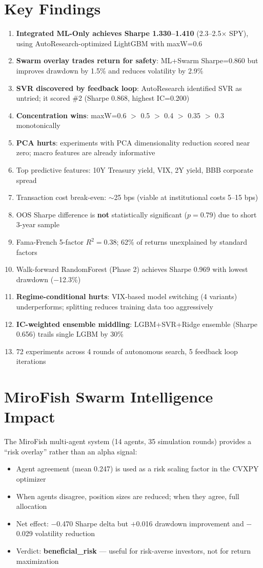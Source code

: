 \documentclass[12pt]{article}
\begin{document}
\section{Key Findings}
\begin{enumerate}
\item \textbf{Integrated ML-Only achieves Sharpe 1.330--1.410} (2.3--2.5$\times$ SPY), using AutoResearch-optimized LightGBM with maxW=0.6
\item \textbf{Swarm overlay trades return for safety}: ML+Swarm Sharpe=0.860 but improves drawdown by 1.5\% and reduces volatility by 2.9\%
\item \textbf{SVR discovered by feedback loop}: AutoResearch identified SVR as untried; it scored \#2 (Sharpe 0.868, highest IC=0.200)
\item \textbf{Concentration wins}: maxW=0.6 $>$ 0.5 $>$ 0.4 $>$ 0.35 $>$ 0.3 monotonically
\item \textbf{PCA hurts}: experiments with PCA dimensionality reduction scored near zero; macro features are already informative
\item Top predictive features: 10Y Treasury yield, VIX, 2Y yield, BBB corporate spread
\item Transaction cost break-even: $\sim$25 bps (viable at institutional costs 5--15 bps)
\item OOS Sharpe difference is \textbf{not} statistically significant ($p = 0.79$) due to short 3-year sample
\item Fama-French 5-factor $R^2 = 0.38$; 62\% of returns unexplained by standard factors
\item Walk-forward RandomForest (Phase 2) achieves Sharpe 0.969 with lowest drawdown ($-$12.3\%)
\item \textbf{Regime-conditional hurts}: VIX-based model switching (4 variants) underperforms; splitting reduces training data too aggressively
\item \textbf{IC-weighted ensemble middling}: LGBM+SVR+Ridge ensemble (Sharpe 0.656) trails single LGBM by 30\%
\item 72 experiments across 4 rounds of autonomous search, 5 feedback loop iterations
\end{enumerate}

\section{MiroFish Swarm Intelligence Impact}
The MiroFish multi-agent system (14 agents, 35 simulation rounds) provides a ``risk overlay'' rather than an alpha signal:
\begin{itemize}
\item Agent agreement (mean 0.247) is used as a risk scaling factor in the CVXPY optimizer
\item When agents disagree, position sizes are reduced; when they agree, full allocation
\item Net effect: $-$0.470 Sharpe delta but $+$0.016 drawdown improvement and $-$0.029 volatility reduction
\item Verdict: \textbf{beneficial\_risk} --- useful for risk-averse investors, not for return maximization
\end{itemize}
\end{document}
